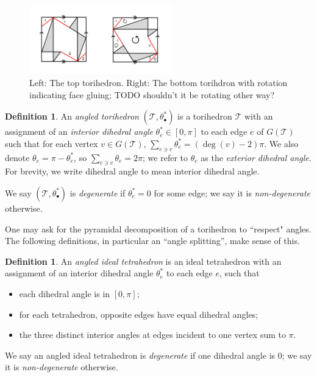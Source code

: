 \documentclass[11pt]{amsart}
\newcommand{\sT}{{\mathcal{T}}}
\theoremstyle{plain}
\theoremstyle{definition}
\newtheorem{define}[theorem]{Definition}
\newtheorem{definition}[theorem]{Definition}
\begin{document}
\begin{figure}[h] 
\centering 
\includegraphics[height=3cm]{top-bottom.png} 
	\caption{Left: The top torihedron.
	Right: The bottom torihdron with rotation indicating face gluing;
	TODO shouldn't it be rotating other way?} 
\label{fig:top-bottom}
\end{figure}



\begin{definition}
An \emph{angled torihedron} $(\sT, \theta_\bullet^*)$
is a torihedron $\sT$ with
an assignment of an \emph{interior dihedral angle}
$\theta_e^* \in [0,\pi]$ to each edge $e$ of $G(\sT)$
such that for each vertex $v \in G(\sT)$,
$\sum_{e \ni v} \theta_e^* = (\deg(v) - 2)\pi$.
We also denote $\theta_e = \pi - \theta_e^*$,
so $\sum_{e \ni v} \theta_e = 2\pi$;
we refer to $\theta_e$ as the \emph{exterior dihedral angle}.
For brevity, we write dihedral angle to mean 
interior dihedral angle.  


We say $(\sT, \theta_\bullet^*)$ is \emph{degenerate}
if $\theta_e^* = 0$ for some edge;
we say it is \emph{non-degenerate} otherwise.
\end{definition}


One may ask for the pyramidal decomposition of a torihedron
to ``respect" angles. The following definitions,
in particular an ``angle splitting'', make sense of this.

\begin{define}
An \emph{angled ideal tetrahedron} is an ideal tetrahedron
with an assignment of an
interior dihedral angle $\theta_e^*$ to each edge $e$, such that
\begin{itemize}
\item each dihedral angle is in $[0, \pi]$;
\item for each tetrahedron, opposite edges have equal dihedral angles;
\item the three distinct interior angles at edges incident to one vertex sum to $\pi$.
\end{itemize}

We say an angled ideal tetrahedron is \emph{degenerate} if
one dihedral angle is 0; we say it is \emph{non-degenerate} otherwise.
\end{define}
\end{document}
